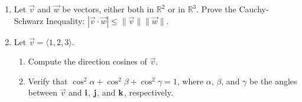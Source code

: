 \documentclass[12pt]{article}
\newif\ifans
\begin{document}
\begin{enumerate}
\newpage

\item Let $\overrightarrow{v}$ and $\overrightarrow{w}$ be vectors, either both in $\mathbb{R}^2$ or in $\mathbb{R}^3$.  Prove the Cauchy-Schwarz Inequality: $|\overrightarrow{v}\cdot \overrightarrow{w}|\leq \|\overrightarrow{v}\|\|\overrightarrow{w}\|$.

\ifans{\fbox{\parbox{1\linewidth}{
Suppose that $\theta$ is the angle between $\overrightarrow{v}$ and $\overrightarrow{w}$.  Then:
\begin{align*}
|\overrightarrow{v}\cdot\overrightarrow{w}|&=\left|\|\overrightarrow{v}\|\|\overrightarrow{w}\|\cos{\theta}\right|\\
&=\left(\|\overrightarrow{v}\|\right)\left(\|\overrightarrow{w}\|\right)\left(|\cos{\theta}|\right)\\
&\leq\left(\|\overrightarrow{v}\|\right)\left(\|\overrightarrow{w}\|\right)(1)\\
&=\|\overrightarrow{v}\| \|\overrightarrow{w}\|
\end{align*}
Thus, $|\overrightarrow{v}\cdot \overrightarrow{w}|\leq \|\overrightarrow{v}\|\|\overrightarrow{w}\|$, as promised.
}}} \fi

\item Let $\overrightarrow{v}=\langle 1,2,3 \rangle$.

\begin{enumerate}

\item Compute the direction cosines of $\overrightarrow{v}$.

\ifans{\fbox{\parbox{1\linewidth}{Let $\alpha$, $\beta$, and $\gamma$ be the angles between $\overrightarrow{v}$ and ${\bf i}$, ${\bf j}$, and ${\bf k}$, respectively.  Then:\\ $\cos{\alpha}=\frac{1}{\sqrt{14}}$, $\cos{\beta}=\frac{2}{\sqrt{14}}$, and $\cos{\gamma}=\frac{3}{\sqrt{14}}$}}} \fi

\item Verify that $\cos^2\alpha+\cos^2\beta+\cos^2\gamma=1$, where $\alpha$, $\beta$, and $\gamma$ be the angles between $\overrightarrow{v}$ and ${\bf i}$, ${\bf j}$, and ${\bf k}$, respectively.

\ifans{\fbox{\parbox{1\linewidth}{Using the information from part (a), we obtain:
\begin{align*}
\cos^2\alpha+\cos^2\beta+\cos^2\gamma&=\left(\frac{1}{\sqrt{14}}\right)^2+\left(\frac{2}{\sqrt{14}}\right)^2+\left(\frac{3}{\sqrt{14}}\right)^2\\
&=\frac{1}{14}+\frac{4}{14}+\frac{9}{14}\\
&=1
\end{align*}
}}} \fi

\end{enumerate}

\end{enumerate}
\end{document}
